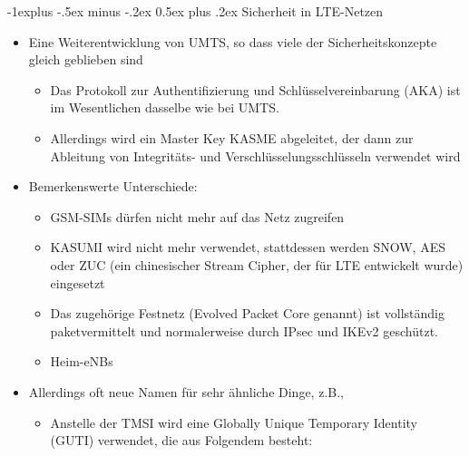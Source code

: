 \documentclass[a4paper]{article}
\makeatletter
\renewcommand{\subsection}{\@startsection{subsection}{2}{0mm}%
 {-1explus -.5ex minus -.2ex}%
 {0.5ex plus .2ex}%
 {\normalfont\normalsize\bfseries}}
\makeatother
\begin{document}
\begin{multicols}{3}
    \subsection{Sicherheit in LTE-Netzen}

    \begin{itemize}
        \item
              Eine Weiterentwicklung von UMTS, so dass viele der Sicherheitskonzepte
              gleich geblieben sind

              \begin{itemize}
                  \item
                        Das Protokoll zur Authentifizierung und Schlüsselvereinbarung (AKA)
                        ist im Wesentlichen dasselbe wie bei UMTS.
                  \item
                        Allerdings wird ein Master Key KASME abgeleitet, der dann zur
                        Ableitung von Integritäts- und Verschlüsselungsschlüsseln verwendet
                        wird
              \end{itemize}
        \item
              Bemerkenswerte Unterschiede:

              \begin{itemize}
                  \item
                        GSM-SIMs dürfen nicht mehr auf das Netz zugreifen
                  \item
                        KASUMI wird nicht mehr verwendet, stattdessen werden SNOW, AES oder
                        ZUC (ein chinesischer Stream Cipher, der für LTE entwickelt wurde)
                        eingesetzt
                  \item
                        Das zugehörige Festnetz (Evolved Packet Core genannt) ist
                        vollständig paketvermittelt und normalerweise durch IPsec und IKEv2
                        geschützt.
                  \item
                        Heim-eNBs
              \end{itemize}
        \item
              Allerdings oft neue Namen für sehr ähnliche Dinge, z.B.,

              \begin{itemize}
                  \item
                        Anstelle der TMSI wird eine Globally Unique Temporary Identity
                        (GUTI) verwendet, die aus Folgendem besteht:


\end{itemize}
\end{itemize}
\end{multicols}
\end{document}
